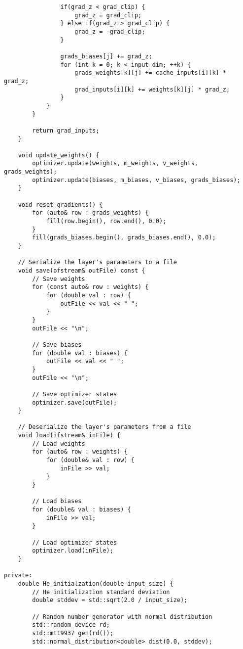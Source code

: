 \begin{verbatim}
                if(grad_z < grad_clip) {
                    grad_z = grad_clip;
                } else if(grad_z > grad_clip) {
                    grad_z = -grad_clip;
                }
 
                grads_biases[j] += grad_z;
                for (int k = 0; k < input_dim; ++k) {
                    grads_weights[k][j] += cache_inputs[i][k] * grad_z;
                    grad_inputs[i][k] += weights[k][j] * grad_z;
                }
            }
        }
 
        return grad_inputs;
    }
 
    void update_weights() {
        optimizer.update(weights, m_weights, v_weights, grads_weights);
        optimizer.update(biases, m_biases, v_biases, grads_biases);
    }
 
    void reset_gradients() {
        for (auto& row : grads_weights) {
            fill(row.begin(), row.end(), 0.0);
        }
        fill(grads_biases.begin(), grads_biases.end(), 0.0);
    }
 
    // Serialize the layer's parameters to a file
    void save(ofstream& outFile) const {
        // Save weights
        for (const auto& row : weights) {
            for (double val : row) {
                outFile << val << " ";
            }
        }
        outFile << "\n";
 
        // Save biases
        for (double val : biases) {
            outFile << val << " ";
        }
        outFile << "\n";
 
        // Save optimizer states
        optimizer.save(outFile);
    }
 
    // Deserialize the layer's parameters from a file
    void load(ifstream& inFile) {
        // Load weights
        for (auto& row : weights) {
            for (double& val : row) {
                inFile >> val;
            }
        }
 
        // Load biases
        for (double& val : biases) {
            inFile >> val;
        }
 
        // Load optimizer states
        optimizer.load(inFile);
    }
 
private:
    double He_initialzation(double input_size) {
        // He initialization standard deviation
        double stddev = std::sqrt(2.0 / input_size);
 
        // Random number generator with normal distribution
        std::random_device rd;
        std::mt19937 gen(rd());
        std::normal_distribution<double> dist(0.0, stddev);
 

\end{verbatim}
